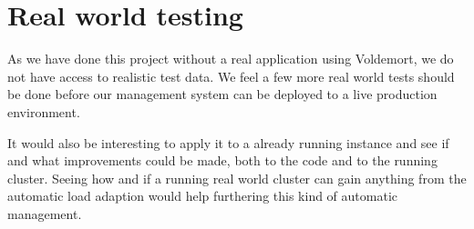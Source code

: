 \section{Real world testing}
As we have done this project without a real application using Voldemort, we do not have access to realistic test data. We feel a few more real world tests should be done before our management system can be deployed to a live production environment.

It would also be interesting to apply it to a already running instance and see if and what improvements could be made, both to the code and to the running cluster.
Seeing how and if a running real world cluster can gain anything from the automatic load adaption would help furthering this kind of automatic management.


